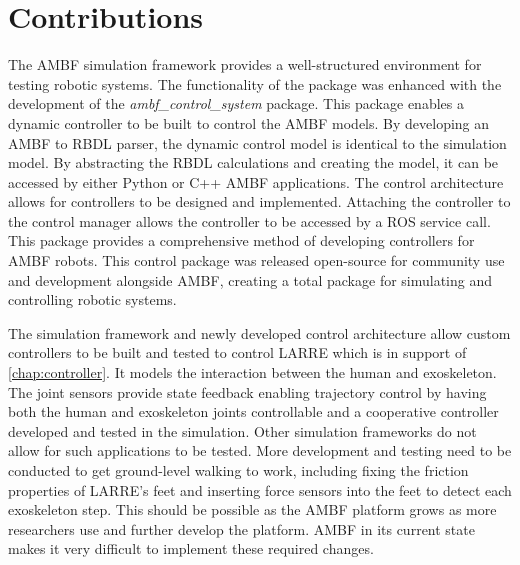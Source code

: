 \section{Contributions}

The AMBF simulation framework provides a well-structured environment for testing robotic systems. The functionality of the package was enhanced with the development of the \textit{ambf\_control\_system} package. This package enables a dynamic controller to be built to control the AMBF models. By developing an AMBF to RBDL parser, the dynamic control model is identical to the simulation model. By abstracting the RBDL calculations and creating the model, it can be accessed by either Python or C++ AMBF applications. The control architecture allows for controllers to be designed and implemented. Attaching the controller to the control manager allows the controller to be accessed by a ROS service call. This package provides a comprehensive method of developing controllers for AMBF robots. This control package was released open-source for community use and development alongside AMBF, creating a total package for simulating and controlling robotic systems.   

The simulation framework and newly developed control architecture allow custom controllers to be built and tested to control LARRE which is in support of \autoref{chap:controller}. It models the interaction between the human and exoskeleton. The joint sensors provide state feedback enabling trajectory control by having both the human and exoskeleton joints controllable and a cooperative controller developed and tested in the simulation. Other simulation frameworks do not allow for such applications to be tested. More development and testing need to be conducted to get ground-level walking to work, including fixing the friction properties of LARRE's feet and inserting force sensors into the feet to detect each exoskeleton step. This should be possible as the AMBF platform grows as more researchers use and further develop the platform. AMBF in its current state makes it very difficult to implement these required changes.   








